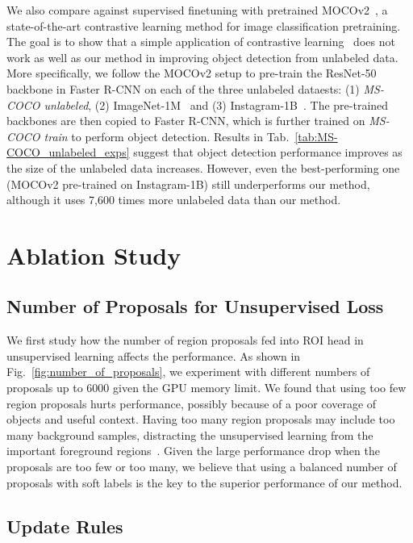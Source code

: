 \documentclass[final]{cvpr}
\begin{document}
We also compare against supervised finetuning with pretrained MOCOv2~\cite{chen2020improved}, a state-of-the-art contrastive learning method for image classification pretraining. The goal is to show that a simple application of contrastive learning~\cite{chen2020improved,He_2020_moco,chen2020simple} does not work as well as our method in improving object detection from unlabeled data. 
More specifically, we follow the MOCOv2 setup to pre-train the ResNet-50 backbone in Faster R-CNN on each of the three unlabeled dataests: (1) \textit{MS-COCO unlabeled}, (2) ImageNet-1M~\cite{deng2009imagenet} and (3) Instagram-1B~\cite{mahajan2018exploring}. The pre-trained backbones are then copied to Faster R-CNN, which is further trained on \textit{MS-COCO train} to perform object detection. Results in Tab.~\ref{tab:MS-COCO_unlabeled_exps} suggest that object detection performance improves as the size of the unlabeled data increases. However, even the best-performing one (MOCOv2 pre-trained on Instagram-1B) still underperforms our method, although it uses 7,600 times more unlabeled data than our method. 

\section{Ablation Study}
\subsection{Number of Proposals for Unsupervised Loss}
\label{sec:num-proposals}
We first study how the number of region proposals fed into ROI head in unsupervised learning affects the performance.
As shown in Fig.~\ref{fig:number_of_proposals}, we experiment with different numbers of proposals up to 6000 given the GPU memory limit.
We found that using too few region proposals hurts performance, possibly because of a poor coverage of objects and useful context. 
Having too many region proposals may include too many background samples, distracting the unsupervised learning from the important foreground regions~\cite{jeong2019consistency}.
Given the large performance drop when the proposals are too few or too many, we believe that using a balanced number of proposals with soft labels is the key to the superior performance of our method. 

\subsection{Update Rules}
\end{document}
